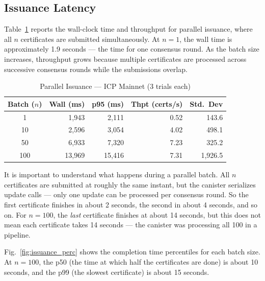 \documentclass[journal]{IEEEtran}
\begin{document}
\subsection{Issuance Latency}

Table~\ref{tab:issuance} reports the wall-clock time and throughput for parallel issuance, where all $n$ certificates are submitted simultaneously. At $n = 1$, the wall time is approximately 1.9 seconds — the time for one consensus round. As the batch size increases, throughput grows because multiple certificates are processed across successive consensus rounds while the submissions overlap.

\begin{table}[t]
\caption{Parallel Issuance --- ICP Mainnet (3 trials each)}
\label{tab:issuance}
\centering\small\renewcommand{\arraystretch}{1.1}
\begin{tabular}{@{}crrrr@{}}
\toprule
\textbf{Batch ($n$)} & \textbf{Wall (ms)} & \textbf{p95 (ms)} & \textbf{Thpt (certs/s)} & \textbf{Std.\ Dev} \\
\midrule
1   & 1{,}943  & 2{,}111  & 0.52 & 143.6 \\
10  & 2{,}596  & 3{,}054  & 4.02 & 498.1 \\
50  & 6{,}933  & 7{,}320  & 7.23 & 325.2 \\
100 & 13{,}969 & 15{,}416 & 7.31 & 1{,}926.5 \\
\bottomrule
\end{tabular}
\end{table}

It is important to understand what happens during a parallel batch. All $n$ certificates are submitted at roughly the same instant, but the canister serializes update calls — only one update can be processed per consensus round. So the first certificate finishes in about 2 seconds, the second in about 4 seconds, and so on. For $n = 100$, the \emph{last} certificate finishes at about 14 seconds, but this does not mean each certificate takes 14 seconds — the canister was processing all 100 in a pipeline.

Fig.~\ref{fig:issuance_perc} shows the completion time percentiles for each batch size. At $n = 100$, the p50 (the time at which half the certificates are done) is about 10 seconds, and the p99 (the slowest certificate) is about 15 seconds.
\end{document}

